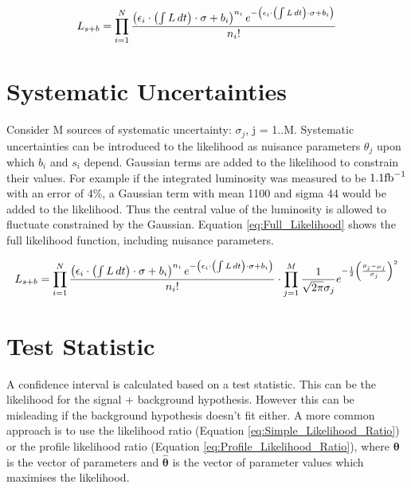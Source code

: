 \begin{equation}
L_{s+b} = \prod_{i=1}^{N}
\frac{\left(\epsilon_{i} \cdot \left(\int L\,dt\right) \cdot \sigma+b_{i}\right)^{n_{i}}e^{-\left(\epsilon_{i} \cdot \left(\int L\,dt\right) \cdot \sigma+b_{i}\right)}}{n_{i}!} 
\label{eq:SignalPlusBackground_Rewritten}
\end{equation}

\section{Systematic Uncertainties}

Consider M sources of systematic uncertainty: $\sigma_{j}$, j = 1..M. Systematic
uncertainties can be introduced to the likelihood as nuisance parameters 
$\theta_{j}$ upon which $b_{i}$ and $s_{i}$ depend. Gaussian terms are added to 
the likelihood to constrain their values. For example if the integrated 
luminosity was measured to be $1.1 \mbox{fb}^{-1}$ with an error of 4\%, a Gaussian term 
with mean 1100 and sigma 44 would be added to the likelihood. Thus the central
value of the luminosity is allowed to fluctuate constrained by the Gaussian.
Equation \ref{eq:Full_Likelihood} shows the full likelihood function, including 
nuisance parameters. 

\begin{equation}
L_{s+b} = \prod_{i=1}^{N}
\frac{\left(\epsilon_{i} \cdot \left(\int L\,dt\right) \cdot \sigma+b_{i}\right)^{n_{i}}e^{-\left(\epsilon_{i} \cdot \left(\int L\,dt\right) \cdot \sigma+b_{i}\right)}}{n_{i}!} 
\cdot \prod_{j=1}^{M} \frac{1}{\sqrt{2\pi}\sigma_{j}}e^{-\frac{1}{2}\left(\frac{\theta_{j} - \mu_{j}}{\sigma_{j}}\right)^{2}} 
\label{eq:Full_Likelihood}
\end{equation}

\section{Test Statistic}

A confidence interval is calculated based on a test statistic. This can be the 
likelihood for the signal + background hypothesis. However this can be misleading
if the background hypothesis doesn't fit either. A more common approach is to 
use the likelihood ratio (Equation \ref{eq:Simple_Likelihood_Ratio}) or the profile
likelihood ratio (Equation \ref{eq:Profile_Likelihood_Ratio}), where 
$\boldsymbol\theta$ is the vector of parameters and $\hat{\boldsymbol\theta}$
is the vector of parameter values which maximises the likelihood. 

